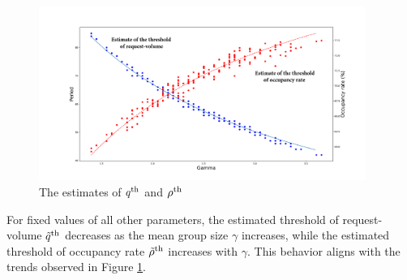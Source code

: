 \begin{figure}[H]
  \caption{The estimates of $q^{\textup{th}}$ and $\rho^{\textup{th}}$}\label{esti_q}
  \centering
    \includegraphics[width=0.95\textwidth]{./Figures/200_random.pdf}
\end{figure}

For fixed values of all other parameters, the estimated threshold of request-volume $\tilde{q}^{\textup{th}}$ decreases as the mean group size $\gamma$ increases, while the estimated threshold of occupancy rate $\tilde{\rho}^{\textup{th}}$ increases with $\gamma$. This behavior aligns with the trends observed in Figure \ref{esti_q}.






